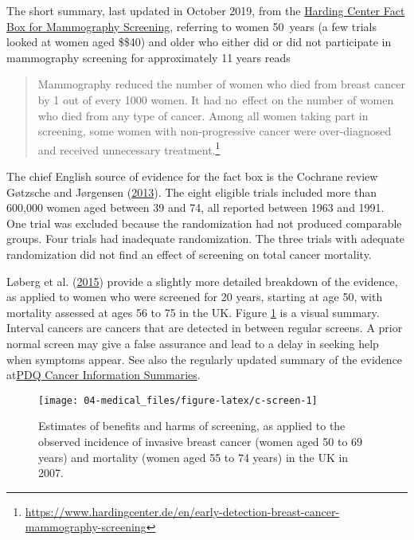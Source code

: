 \documentclass[
  10ptls,
  b5paper]{book}
\begin{document}
The short summary, last updated in October 2019, from the \href{https://www.hardingcenter.de/en/early-detection-breast-cancer-mammography-screening}{Harding
Center Fact Box for Mammography
Screening},
referring to women 50~years (a few trials looked at women aged
\$\geq\$40) and older who either did or did not participate in
mammography screening for approximately 11 years reads

\begin{quote}
Mammography reduced the number of women who died from breast cancer by
1 out of every 1000 women. It had no~effect on the number of women who
died from any type of cancer. Among all women taking part in
screening, some women with non-progressive cancer were over-diagnosed
and received unnecessary treatment.\footnote{\url{https://www.hardingcenter.de/en/early-detection-breast-cancer-mammography-screening}}
\end{quote}

The chief English source of evidence for the fact box is the Cochrane
review Gøtzsche and Jørgensen (\protect\hyperlink{ref-gotzsche2013screening}{2013}). The eight eligible trials included more
than 600,000 women aged between 39 and 74, all reported between 1963 and
1991. One trial was excluded because the randomization had not produced
comparable groups. Four trials had inadequate randomization. The three
trials with adequate randomization did not find an effect of screening
on total cancer mortality.

Løberg et al. (\protect\hyperlink{ref-loberg2015benefits}{2015}) provide a slightly more detailed breakdown of the
evidence, as applied to women who were screened for 20 years, starting
at age 50, with mortality assessed at ages 56 to 75 in the UK. Figure
\ref{fig:c-screen} is a visual summary. Interval cancers are cancers
that are detected in between regular screens. A prior normal screen may
give a false assurance and lead to a delay in seeking help when symptoms
appear. See also the regularly updated summary of the evidence at\href{https://www.ncbi.nlm.nih.gov/books/NBK65906/}{PDQ
Cancer Information
Summaries}.

\begin{figure}[H]

{\centering \texttt{[image: 04-medical\_files/figure-latex/c-screen-1]} 

}

\caption{Estimates of benefits and harms of screening, as applied to the observed incidence of invasive breast cancer (women aged 50 to 69 years) and mortality (women aged 55 to 74 years) in the UK in 2007.}\label{fig:c-screen}
\end{figure}
\end{document}
